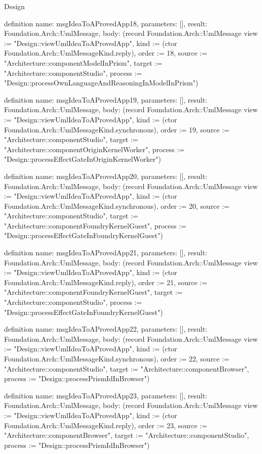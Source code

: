 \begin{lexlean}{Design}
\begin{semanticmodule}
definition{
  name: msgIdeaToAProvedApp18,
  parameters: [],
  result: Foundation.Arch::UmlMessage,
  body: (record Foundation.Arch::UmlMessage {view := "Design::viewUmlIdeaToAProvedApp", kind := (ctor Foundation.Arch::UmlMessageKind.reply), order := 18, source := "Architecture::componentModelInPrism", target := "Architecture::componentStudio", process := "Design::processOwnLanguageAndReasoningInModelInPrism"})
}

definition{
  name: msgIdeaToAProvedApp19,
  parameters: [],
  result: Foundation.Arch::UmlMessage,
  body: (record Foundation.Arch::UmlMessage {view := "Design::viewUmlIdeaToAProvedApp", kind := (ctor Foundation.Arch::UmlMessageKind.synchronous), order := 19, source := "Architecture::componentStudio", target := "Architecture::componentOriginKernelWorker", process := "Design::processEffectGateInOriginKernelWorker"})
}

definition{
  name: msgIdeaToAProvedApp20,
  parameters: [],
  result: Foundation.Arch::UmlMessage,
  body: (record Foundation.Arch::UmlMessage {view := "Design::viewUmlIdeaToAProvedApp", kind := (ctor Foundation.Arch::UmlMessageKind.synchronous), order := 20, source := "Architecture::componentStudio", target := "Architecture::componentFoundryKernelGuest", process := "Design::processEffectGateInFoundryKernelGuest"})
}

definition{
  name: msgIdeaToAProvedApp21,
  parameters: [],
  result: Foundation.Arch::UmlMessage,
  body: (record Foundation.Arch::UmlMessage {view := "Design::viewUmlIdeaToAProvedApp", kind := (ctor Foundation.Arch::UmlMessageKind.reply), order := 21, source := "Architecture::componentFoundryKernelGuest", target := "Architecture::componentStudio", process := "Design::processEffectGateInFoundryKernelGuest"})
}

definition{
  name: msgIdeaToAProvedApp22,
  parameters: [],
  result: Foundation.Arch::UmlMessage,
  body: (record Foundation.Arch::UmlMessage {view := "Design::viewUmlIdeaToAProvedApp", kind := (ctor Foundation.Arch::UmlMessageKind.synchronous), order := 22, source := "Architecture::componentStudio", target := "Architecture::componentBrowser", process := "Design::processPrismIdInBrowser"})
}

definition{
  name: msgIdeaToAProvedApp23,
  parameters: [],
  result: Foundation.Arch::UmlMessage,
  body: (record Foundation.Arch::UmlMessage {view := "Design::viewUmlIdeaToAProvedApp", kind := (ctor Foundation.Arch::UmlMessageKind.reply), order := 23, source := "Architecture::componentBrowser", target := "Architecture::componentStudio", process := "Design::processPrismIdInBrowser"})
}


\end{semanticmodule}
\end{lexlean}
